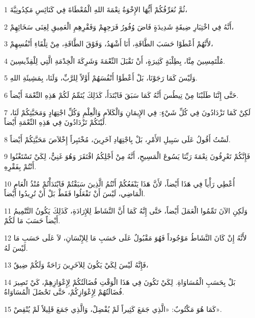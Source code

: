 \par 1 ثُمَّ نُعَرِّفُكُمْ أَيُّهَا الإِخْوَةُ نِعْمَةَ اللهِ الْمُعْطَاةَ فِي كَنَائِسِ مَكِدُونِيَّةَ،
\par 2 أَنَّهُ فِي اخْتِبَارِ ضِيقَةٍ شَدِيدَةٍ فَاضَ وُفُورُ فَرَحِهِمْ وَفَقْرِهِمِ الْعَمِيقِ لِغِنَى سَخَائِهِمْ،
\par 3 لأَنَّهُمْ أَعْطَوْا حَسَبَ الطَّاقَةِ، أَنَا أَشْهَدُ، وَفَوْقَ الطَّاقَةِ، مِنْ تِلْقَاءِ أَنْفُسِهِمْ،
\par 4 مُلْتَمِسِينَ مِنَّا، بِطِلْبَةٍ كَثِيرَةٍ، أَنْ نَقْبَلَ النِّعْمَةَ وَشَرِكَةَ الْخِدْمَةِ الَّتِي لِلْقِدِّيسِينَ.
\par 5 وَلَيْسَ كَمَا رَجَوْنَا، بَلْ أَعْطَوْا أَنْفُسَهُمْ أَوَّلاً لِلرَّبِّ، وَلَنَا، بِمَشِيئَةِ اللهِ.
\par 6 حَتَّى إِنَّنَا طَلَبْنَا مِنْ تِيطُسَ أَنَّهُ كَمَا سَبَقَ فَابْتَدَأَ، كَذَلِكَ يُتَمِّمُ لَكُمْ هَذِهِ النِّعْمَةَ أَيْضاً.
\par 7 لَكِنْ كَمَا تَزْدَادُونَ فِي كُلِّ شَيْءٍ: فِي الإِيمَانِ وَالْكَلاَمِ وَالْعِلْمِ وَكُلِّ اجْتِهَادٍ وَمَحَبَّتِكُمْ لَنَا، لَيْتَكُمْ تَزْدَادُونَ فِي هَذِهِ النِّعْمَةِ أَيْضاً.
\par 8 لَسْتُ أَقُولُ عَلَى سَبِيلِ الأَمْرِ، بَلْ بِاجْتِهَادِ آخَرِينَ، مُخْتَبِراً إِخْلاَصَ مَحَبَّتِكُمْ أَيْضاً.
\par 9 فَإِنَّكُمْ تَعْرِفُونَ نِعْمَةَ رَبِّنَا يَسُوعَ الْمَسِيحِ، أَنَّهُ مِنْ أَجْلِكُمُ افْتَقَرَ وَهُوَ غَنِيٌّ، لِكَيْ تَسْتَغْنُوا أَنْتُمْ بِفَقْرِهِ.
\par 10 أُعْطِي رَأْياً فِي هَذَا أَيْضاً، لأَنَّ هَذَا يَنْفَعُكُمْ أَنْتُمُ الَّذِينَ سَبَقْتُمْ فَابْتَدَأْتُمْ مُنْذُ الْعَامِ الْمَاضِي، لَيْسَ أَنْ تَفْعَلُوا فَقَطْ بَلْ أَنْ تُرِيدُوا أَيْضاً.
\par 11 وَلَكِنِ الآنَ تَمِّمُوا الْعَمَلَ أَيْضاً، حَتَّى إِنَّهُ كَمَا أَنَّ النَّشَاطَ لِلإِرَادَةِ، كَذَلِكَ يَكُونُ التَّتْمِيمُ أَيْضاً حَسَبَ مَا لَكُمْ.
\par 12 لأَنَّهُ إِنْ كَانَ النَّشَاطُ مَوْجُوداً فَهُوَ مَقْبُولٌ عَلَى حَسَبِ مَا لِلإِنْسَانِ، لاَ عَلَى حَسَبِ مَا لَيْسَ لَهُ.
\par 13 فَإِنَّهُ لَيْسَ لِكَيْ يَكُونَ لِلآخَرِينَ رَاحَةٌ وَلَكُمْ ضِيقٌ،
\par 14 بَلْ بِحَسَبِ الْمُسَاوَاةِ. لِكَيْ تَكُونَ فِي هَذَا الْوَقْتِ فُضَالَتُكُمْ لِإِعْوَازِهِمْ، كَيْ تَصِيرَ فُضَالَتُهُمْ لِإِعْوَازِكُمْ، حَتَّى تَحْصُلَ الْمُسَاوَاةُ.
\par 15 كَمَا هُوَ مَكْتُوبٌ: «الَّذِي جَمَعَ كَثِيراً لَمْ يُفْضِلْ، وَالَّذِي جَمَعَ قَلِيلاً لَمْ يُنْقِصْ».
